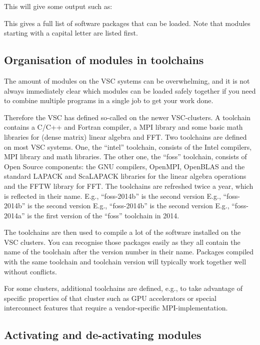 This will give some output such as:


This gives a full list of software packages that can be loaded. Note that
modules starting with a capital letter are listed first.

\subsection{Organisation of modules in toolchains}

The amount of modules on the VSC systems can be overwhelming, and it is not
always immediately clear which modules can be loaded safely together if you
need to combine multiple programs in a single job to get your work done.

Therefore the VSC has defined so-called  on the newer VSC-clusters.
A toolchain contains a C/C++ and Fortran compiler, a MPI library and some basic
math libraries for (dense matrix) linear algebra and FFT. Two toolchains are
defined on most VSC systems. One, the ``intel'' toolchain, consists of the Intel
compilers, MPI library and math libraries. The other one, the ``foss'' toolchain,
consists of Open Source components: the GNU compilers, OpenMPI, OpenBLAS and
the standard LAPACK and ScaLAPACK libraries for the linear algebra operations
and the FFTW library for FFT. The toolchains are refreshed twice a year,
which is reflected in their name.
\ifantwerpen
E.g., ``foss-2014b'' is the second version
\fi
\ifgent
E.g., ``foss-2014b'' is the second version
\fi
\ifbrussel
E.g., ``foss-2014b'' is the second version
\fi
\ifleuven
E.g., ``foss-2014a'' is the first version
\fi
of the ``foss'' toolchain in 2014.

The toolchains are then used to compile a lot of the software installed on
the VSC clusters. You can recognise those packages easily as they all contain the
name of the toolchain after the version number in their name. Packages
compiled with the same toolchain and toolchain version will typically work
together well without conflicts.

For some clusters, additional toolchains are defined, e.g., to take advantage
of specific properties of that cluster such as GPU accelerators or special
interconnect features that require a vendor-specific MPI-implementation.

\subsection{Activating and de-activating modules}
\label{subsec:activating-and-deactivating-modules}

